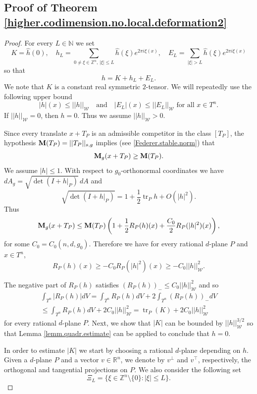 \documentclass[11pt]{amsart}
\def\R{\mathbb R}
\def\N{\mathbb N}
\def\Z{\mathbb Z}
\def\tr{\operatorname{tr}}
\theoremstyle{remark}
\theoremstyle{definition}
\begin{document}
	\subsection{Proof of Theorem \ref{higher.codimension.no.local.deformation2}}
	\begin{proof}
		For every $L\in \N$ we set
		$$ 
		K=\hat h(0),\quad h_L=\sum_{{0\neq\xi}\in\Z^n,\, |\xi|\leq L}\widehat h(\xi)e^{2\pi i \xi(x)},\quad E_L=\sum_{{|\xi|>L}}\widehat h(\xi)e^{2\pi i \xi(x)}
		$$
		so that
		$$
		h=K+h_L+E_L.
		$$
		We note that $K$ is a constant real symmetric $2$-tensor. We will repeatedly use the following upper bound
		$$|h|(x)\leq ||h||_{\mathcal W} \quad\text{and}\quad |E_L|(x)\leq ||E_L||_{\mathcal W}\text{ for all }x\in T^n.$$
		If $||h||_{\mathcal W}=0$, then $h=0$. Thus we assume $||h||_{\mathcal W}>0$.
		
		Since every translate $x+T_P$ is an admissible competitor in the class $[T_P]$, the hypothesis {${\bf M}(T_P)=||T_P||_{s,g}$
			implies (see \eqref{Federer.stable.norm}) that}
		$$
		{\bf M}_g(x+T_P)\geq {\bf M}(T_P).
		$$
		We assume $|h|\leq 1$. {With respect to $g_0$-orthonormal coordinates we have
			$
			dA_g=\sqrt{\det(I+h|_P)}\,dA
			$
			and
			$$
			\sqrt{\det(I+h|_P)} =1+\frac12\tr_P h+O(|h|^2).
			$$}Thus 
		$$
		{\bf M}_g(x+T_P)\leq {\bf M}(T_P)\left(1+\frac12R_P(h)(x)+ \frac{C_0}{2}R_P(|h|^2)(x)\right),
		$$
		{for some $C_0=C_0(n,d,g_0)$.}
		Therefore we have for  {every} rational $d$-plane $P$ and $x\in T^n$,
		\begin{equation}\label{first.inequality}
			R_P(h)(x)\geq -C_0 R_P(|h|^2)(x)\geq -C_0||h||^2_{\mathcal W}.
		\end{equation}
		
		
		The negative part of $R_P(h)$ satisfies $(R_P(h))_-\leq C_0||h||^2_{\mathcal W}$ and so
		\begin{multline}\label{first.inequality.2}
			\int_{T^n}|R_P(h)|dV=\int_{T^n}R_P(h)dV+2\int_{T^n}(R_P(h))_-dV\\ 
			\leq\int_{T^n}R_P(h)dV +2C_0||h||^2_{\mathcal W}=\tr _P(K) +2C_0||h||^2_{\mathcal W}
		\end{multline}
		for every rational $d$-plane $P$. Next, we show that $|K|$ can be bounded by $||h||^{3/2}_{\mathcal W}$ so that Lemma \ref{lemm.quadr.estimate} can be applied {to conclude that $h=0$.} 
		
		
		In order to estimate $|K|$  we start by choosing a rational $d$-plane depending on $h$. Given a $d$-plane $P$ and a vector $v\in \R^n$, we denote by $v^{\bot}$ and $v^{\top}$, respectively, the orthogonal and tangential projections on $P$. We also consider the following set
		$$
		\Xi_L=\{\xi\in\Z^n\setminus\{0\}:|\xi|\leq L\}.
		$$
		

\end{proof}
\end{document}
